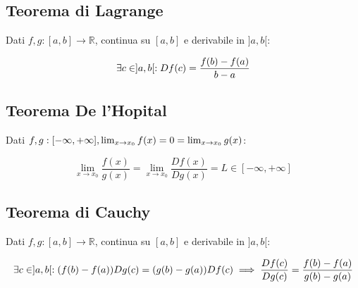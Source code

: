 \documentclass{article}
\begin{document}
\subsection{Teorema di Lagrange}

Dati $f,g : [a,b] \to \mathbb{R}$, continua su $[a,b]$ e derivabile in $]a,b[$:

$$
\exists \space c \in \space ]a,b[ \space : Df(c) = \frac{f(b)- f(a)}{b - a}
$$

\subsection{Teorema De l'Hopital}

Dati $f,g : [-\infty,+\infty], \space \lim_{x \to x_0} f(x) = 0 = \lim_{x \to x_0} g(x)$:

$$
\lim_{x \to x_0} \frac{f(x)}{g(x)} =
\lim_{x \to x_0} \frac{Df(x)}{Dg(x)} =
L \in [-\infty,+\infty]
$$

\subsection{Teorema di Cauchy}

Dati $f,g : [a,b] \to \mathbb{R}$, continua su $[a,b]$ e derivabile in $]a,b[$:

$$
\exists \space c \in \space ]a,b[ \space :
(f(b) - f(a))Dg(c) = (g(b) - g(a))Df(c) \implies
\frac{Df(c)}{Dg(c)} = \frac{f(b) - f(a)}{g(b) - g(a)}
$$
\end{document}
